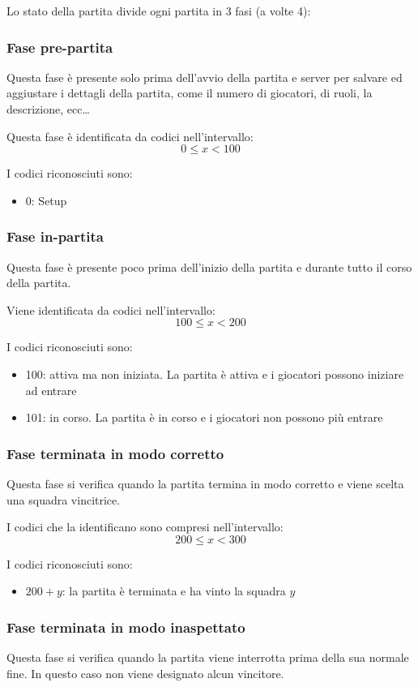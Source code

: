 \documentclass[10pt,a4paper]{article}
\begin{document}
Lo stato della partita divide ogni partita in 3 fasi (a volte 4):

\subsubsection{Fase pre-partita}
Questa fase è presente solo prima dell'avvio della partita e server per salvare ed aggiustare i dettagli della partita, come il numero di giocatori, di ruoli, la descrizione, ecc\dots

Questa fase è identificata da codici nell'intervallo:
\[
	0 \le x < 100
\]

I codici riconosciuti sono:
\begin{itemize}
\item 0: Setup
\end{itemize}

\subsubsection{Fase in-partita}
Questa fase è presente poco prima dell'inizio della partita e durante tutto il corso della partita. 

Viene identificata da codici nell'intervallo:
\[
	100 \le x < 200
\]

I codici riconosciuti sono:
\begin{itemize}
\item 100: attiva ma non iniziata. La partita è attiva e i giocatori possono iniziare ad entrare
\item 101: in corso. La partita è in corso e i giocatori non possono più entrare
\end{itemize}

\subsubsection{Fase terminata in modo corretto}
Questa fase si verifica quando la partita termina in modo corretto e viene scelta una squadra vincitrice.

I codici che la identificano sono compresi nell'intervallo:
\[
	200 \le x < 300
\]

I codici riconosciuti sono:
\begin{itemize}
\item $200+y$: la partita è terminata e ha vinto la squadra $y$
\end{itemize}

\subsubsection{Fase terminata in modo inaspettato}
Questa fase si verifica quando la partita viene interrotta prima della sua normale fine. In questo caso non viene designato alcun vincitore.
\end{document}

